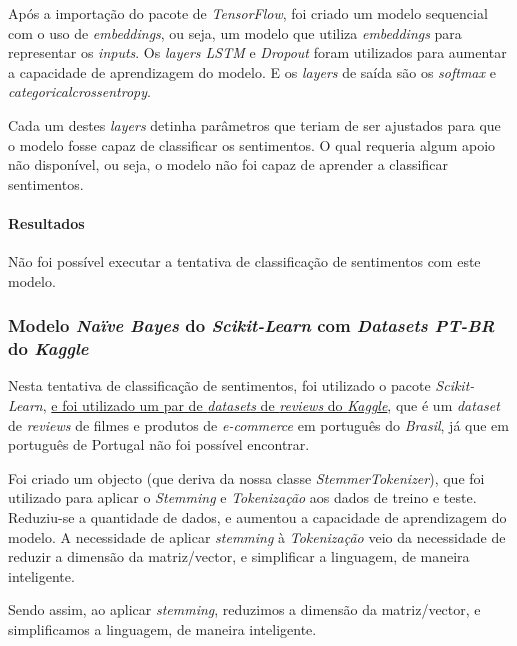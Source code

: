 Após a importação do pacote de \textit{TensorFlow}, foi criado um modelo sequencial com o uso de \textit{embeddings}, ou seja, um modelo que utiliza \textit{embeddings} para representar os \textit{inputs}. Os \textit{layers LSTM} e \textit{Dropout} foram utilizados para aumentar a capacidade de aprendizagem do modelo. E os \textit{layers} de saída são os \textit{softmax} e \textit{categorical\textunderscore crossentropy}.

Cada um destes \textit{layers} detinha parâmetros que teriam de ser ajustados para que o modelo fosse capaz de classificar os sentimentos. O qual requeria algum apoio não disponível, ou seja, o modelo não foi capaz de aprender a classificar sentimentos.

\paragraph{Resultados\\}

Não foi possível executar a tentativa de classificação de sentimentos com este modelo.

\subsubsection{Modelo \textit{Naïve Bayes} do \textit{Scikit-Learn} com \textit{Datasets PT-BR} do \textit{Kaggle}}

Nesta tentativa de classificação de sentimentos, foi utilizado o pacote \textit{Scikit-Learn}, \href{https://www.kaggle.com/fredericods/ptbr-sentiment-analysis-datasets}{e foi utilizado um par de \textit{datasets} de \textit{reviews} do \textit{Kaggle}}, que é um \textit{dataset} de \textit{reviews} de filmes e produtos de \textit{e-commerce} em português do \textit{Brasil}, já que em português de Portugal não foi possível encontrar.

Foi criado um objecto (que deriva da nossa classe \textit{StemmerTokenizer}), que foi utilizado para aplicar o \textit{Stemming} e \textit{Tokenização} aos dados de treino e teste. Reduziu-se a quantidade de dados, e aumentou a capacidade de aprendizagem do modelo. A necessidade de aplicar \textit{stemming} à \textit{Tokenização} veio da necessidade de reduzir a dimensão da matriz/vector, e simplificar a linguagem, de maneira inteligente.

Sendo assim, ao aplicar \textit{stemming}, reduzimos a dimensão da matriz/vector, e simplificamos a linguagem, de maneira inteligente.

